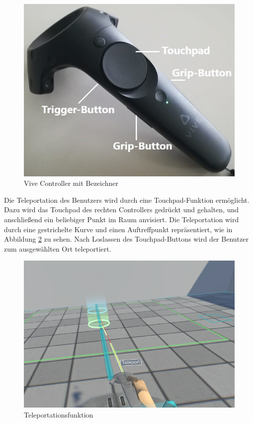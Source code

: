 \begin{figure}[h]
\captionsetup{width=.7\linewidth}
\includegraphics[scale=0.5]{Bilder/Hauptteil/vivecontrollerextended}
\centering
\caption{Vive Controller mit Bezeichner}
\label{fig:vivecontrollerextended}
\end{figure}

\noindent Die Teleportation des Benutzers wird durch eine Touchpad-Funktion ermöglicht. Dazu wird das Touchpad des rechten Controllers gedrückt und gehalten, und anschließend ein beliebiger Punkt im Raum anvisiert. Die Teleportation wird durch eine gestrichelte Kurve und einen Auftreffpunkt repräsentiert, wie in Abbildung \ref{fig:teleportation} zu sehen. Nach Loslassen des Touchpad-Buttons wird der Benutzer zum ausgewählten Ort teleportiert.

\begin{figure}[h]
\captionsetup{width=.7\linewidth}
\includegraphics[scale=0.5]{Bilder/Hauptteil/Bearbeitet/Teleport}
\centering
\caption{Teleportationsfunktion}
\label{fig:teleportation}
\end{figure}

